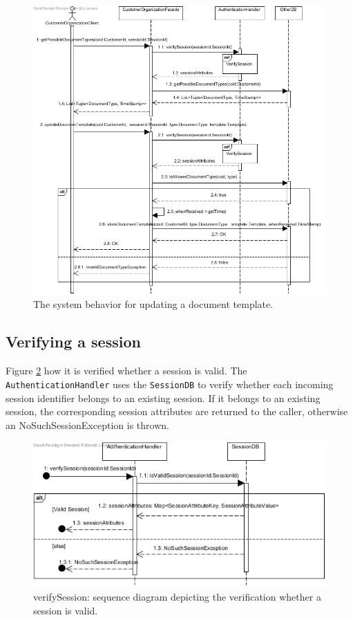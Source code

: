 \documentclass[a4paper,10pt]{article}
\begin{document}
\begin{figure}[!htp]
    \centering
    \includegraphics[width=\textwidth]{Seq_UC20UpdateDocumentTemplate.png}

    
    \caption{The system behavior for updating a document template.
        }\label{fig:seq_UC20UpdateDocumentTemplate}
\end{figure}

\subsection{Verifying a session}
Figure \ref{fig:seq_VerifySession} how it is verified whether a session is valid. The \texttt{AuthenticationHandler} uses the \texttt{SessionDB} to verify whether each incoming session identifier belongs to an existing session. If it belongs to an existing session, the corresponding session attributes are returned to the caller, otherwise an NoSuchSessionException is thrown.
\begin{figure}[!htp]
    \centering
    \includegraphics[width=\textwidth]{Seq_VerifySession.png}
    \caption{verifySession: sequence diagram depicting the verification whether a session is valid.
        }\label{fig:seq_VerifySession}
\end{figure}
\end{document}
